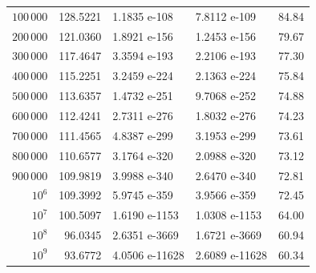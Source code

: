 \documentclass[10pt]{amsart}
\theoremstyle{definition}
\numberwithin{equation}{section}
\begin{document}
\begin{table}[h!]
\begin{tabular}{|r|r|l|l|r|}
$100\,000$ & 128.5221 & 1.1835 e-108 & 7.8112 e-109 & 84.84 \\
$200\,000$ & 121.0360 & 1.8921 e-156 & 1.2453 e-156 & 79.67 \\
$300\,000$ & 117.4647 & 3.3594 e-193 & 2.2106 e-193 & 77.30 \\
$400\,000$ & 115.2251 & 3.2459 e-224 & 2.1363 e-224 & 75.84 \\
$500\,000$ & 113.6357 & 1.4732 e-251 & 9.7068 e-252 & 74.88 \\
$600\,000$ & 112.4241 & 2.7311 e-276 & 1.8032 e-276 & 74.23 \\
$700\,000$ & 111.4565 & 4.8387 e-299 & 3.1953 e-299 & 73.61 \\
$800\,000$ & 110.6577 & 3.1764 e-320 & 2.0988 e-320 & 73.12 \\
$900\,000$ & 109.9819 & 3.9988 e-340 & 2.6470 e-340 & 72.81 \\
$10^{6}$ & 109.3992 & 5.9745 e-359 & 3.9566 e-359 & 72.45 \\
$10^{7}$ & 100.5097 & 1.6190 e-1153 & 1.0308 e-1153 & 64.00 \\
$10^{8}$ & 96.0345 & 2.6351 e-3669 & 1.6721 e-3669 & 60.94 \\
$10^{9}$ & 93.6772 & 4.0506 e-11628 & 2.6089 e-11628 & 60.34 \\
\hline 
\end{tabular}
\end{table}
%
\newpage
%
\end{document}
